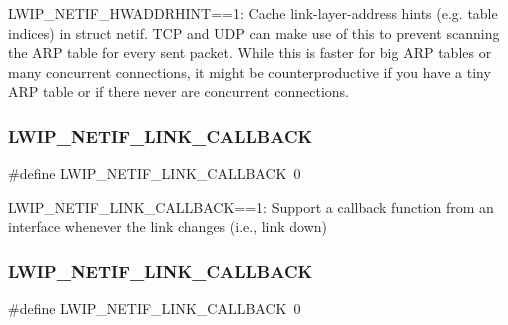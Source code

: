 L\+W\+I\+P\+\_\+\+N\+E\+T\+I\+F\+\_\+\+H\+W\+A\+D\+D\+R\+H\+I\+NT==1\+: Cache link-\/layer-\/address hints (e.\+g. table indices) in struct netif. T\+CP and U\+DP can make use of this to prevent scanning the A\+RP table for every sent packet. While this is faster for big A\+RP tables or many concurrent connections, it might be counterproductive if you have a tiny A\+RP table or if there never are concurrent connections. \mbox{\label{group__lwip__opts__netif_ga1a446932dd927cc4136ba654c13bb97b}} 
\subsubsection{\texorpdfstring{L\+W\+I\+P\+\_\+\+N\+E\+T\+I\+F\+\_\+\+L\+I\+N\+K\+\_\+\+C\+A\+L\+L\+B\+A\+CK}{LWIP\_NETIF\_LINK\_CALLBACK}\hspace{0.1cm}{\footnotesize\ttfamily [1/2]}}
{\footnotesize\ttfamily \#define L\+W\+I\+P\+\_\+\+N\+E\+T\+I\+F\+\_\+\+L\+I\+N\+K\+\_\+\+C\+A\+L\+L\+B\+A\+CK~0}

L\+W\+I\+P\+\_\+\+N\+E\+T\+I\+F\+\_\+\+L\+I\+N\+K\+\_\+\+C\+A\+L\+L\+B\+A\+CK==1\+: Support a callback function from an interface whenever the link changes (i.\+e., link down) \mbox{\label{group__lwip__opts__netif_ga1a446932dd927cc4136ba654c13bb97b}} 
\subsubsection{\texorpdfstring{L\+W\+I\+P\+\_\+\+N\+E\+T\+I\+F\+\_\+\+L\+I\+N\+K\+\_\+\+C\+A\+L\+L\+B\+A\+CK}{LWIP\_NETIF\_LINK\_CALLBACK}\hspace{0.1cm}{\footnotesize\ttfamily [2/2]}}
{\footnotesize\ttfamily \#define L\+W\+I\+P\+\_\+\+N\+E\+T\+I\+F\+\_\+\+L\+I\+N\+K\+\_\+\+C\+A\+L\+L\+B\+A\+CK~0}

